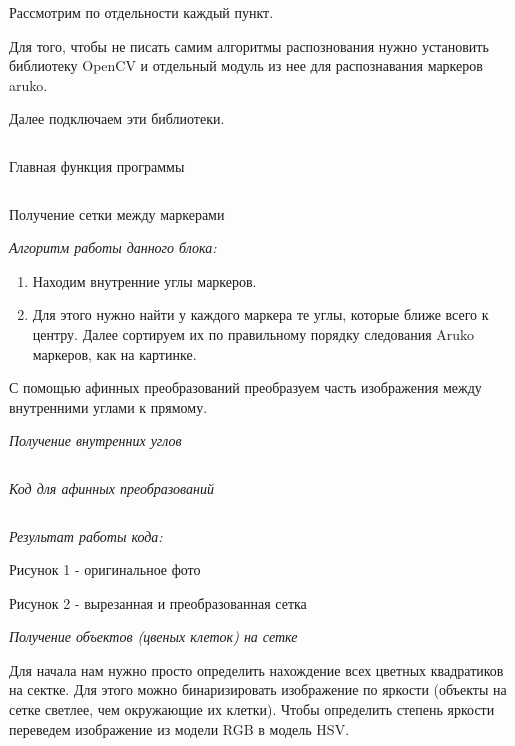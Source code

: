 Рассмотрим по отдельности каждый пункт.

Для того, чтобы не писать самим алгоритмы распознования нужно установить библиотеку OpenCV и отдельный модуль из нее для распознавания маркеров aruko.

Далее подключаем эти библиотеки.

\inputminted[fontsize=\footnotesize, linenos]{python}{2nd_tour/ar/task_68/source_1.py}

Главная функция программы

\inputminted[fontsize=\footnotesize, linenos]{python}{2nd_tour/ar/task_68/source_2.py}

Получение сетки между маркерами

\textit{Алгоритм работы данного блока:}

\begin{enumerate}
    \item Находим внутренние углы маркеров.
    \item Для этого нужно найти у каждого маркера те углы, которые ближе всего к центру. Далее сортируем их по правильному порядку следования Aruko маркеров, как на картинке.
\end{enumerate}

С помощью афинных преобразований преобразуем часть изображения между внутренними углами к прямому.


\textit{Получение внутренних углов}

\inputminted[fontsize=\footnotesize, linenos]{python}{2nd_tour/ar/task_68/source_3.py}

\textit{Код для афинных преобразований}

\inputminted[fontsize=\footnotesize, linenos]{python}{2nd_tour/ar/task_68/source_4.py}

\textit{Результат работы кода:}

Рисунок 1 - оригинальное фото

Рисунок 2 - вырезанная и преобразованная сетка


\textit{Получение объектов (цвеных клеток) на сетке}

Для начала нам нужно просто определить нахождение всех цветных квадратиков на сектке. Для этого можно бинаризировать изображение по яркости (объекты на сетке светлее, чем окружающие их клетки). Чтобы определить степень яркости переведем изображение из модели RGB в модель HSV.

